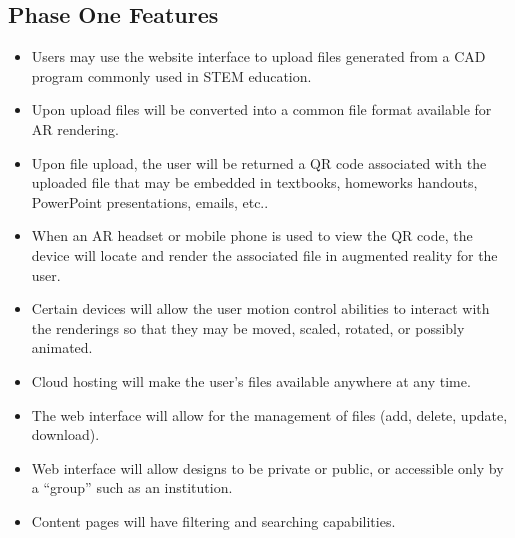 \subsection{Phase One Features}
\begin{itemize}
	\item Users may use the website interface to upload files generated from a CAD program commonly used in STEM education. 
	\item  Upon upload files will be converted into a common file format available for AR rendering. 
	\item Upon file upload, the user will be returned a QR code associated with the uploaded file that may be embedded in textbooks, homeworks handouts, PowerPoint presentations, emails, etc..
	\item When an AR headset or mobile phone is used to view the QR code, the device will locate and render the associated file in augmented reality for the user.  
	\item Certain devices will allow the user motion control abilities to interact with the renderings so that they may be moved, scaled, rotated, or possibly animated. 
	\item Cloud hosting will make the user’s files available anywhere at any time. 
	\item The web interface will allow for the management of files (add, delete, update, download). 
	\item Web interface will allow designs to be private or public, or accessible only by a “group” such as an institution.
	\item Content pages will have filtering and searching capabilities.
\end{itemize}

